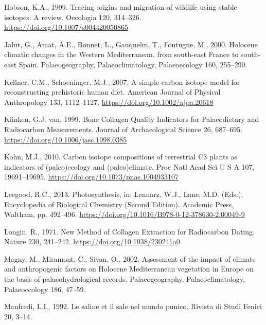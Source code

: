 \documentclass[preprint, 3p, authoryear]{elsarticle} %
\newlength{\cslhangindent}
\newlength{\cslentryspacingunit} %
\newenvironment{CSLReferences}[2] %
 {%
  \setlength{\parindent}{0pt}
  \ifodd #1
  \let\oldpar\par
  \def\par{\hangindent=\cslhangindent\oldpar}
  \fi
  \setlength{\parskip}{#2\cslentryspacingunit}
 }%
 {}
\begin{document}
\begin{CSLReferences}{1}{0}
\leavevmode{}%
Hobson, K.A., 1999. Tracing origins and migration of wildlife using stable isotopes: A review. Oecologia 120, 314--326. \url{https://doi.org/10.1007/s004420050865}

\leavevmode{}%
Jalut, G., Amat, A.E., Bonnet, L., Gauquelin, T., Fontugne, M., 2000. Holocene climatic changes in the {Western Mediterranean}, from south-east {France} to south-east {Spain}. Palaeogeography, Palaeoclimatology, Palaeoecology 160, 255--290.

\leavevmode{}%
Kellner, C.M., Schoeninger, M.J., 2007. A simple carbon isotope model for reconstructing prehistoric human diet. American Journal of Physical Anthropology 133, 1112--1127. \url{https://doi.org/10.1002/ajpa.20618}

\leavevmode{}%
Klinken, G.J. van, 1999. Bone {Collagen Quality Indicators} for {Palaeodietary} and {Radiocarbon Measurements}. Journal of Archaeological Science 26, 687--695. \url{https://doi.org/10.1006/jasc.1998.0385}

\leavevmode{}%
Kohn, M.J., 2010. Carbon isotope compositions of terrestrial {C3} plants as indicators of (paleo)ecology and (paleo)climate. Proc Natl Acad Sci U S A 107, 19691--19695. \url{https://doi.org/10.1073/pnas.1004933107}

\leavevmode{}%
Leegood, R.C., 2013. Photosynthesis, in: Lennarz, W.J., Lane, M.D. (Eds.), Encyclopedia of {Biological Chemistry} ({Second Edition}). {Academic Press}, {Waltham}, pp. 492--496. \url{https://doi.org/10.1016/B978-0-12-378630-2.00049-9}

\leavevmode{}%
Longin, R., 1971. New {Method} of {Collagen Extraction} for {Radiocarbon Dating}. Nature 230, 241--242. \url{https://doi.org/10.1038/230241a0}

\leavevmode{}%
Magny, M., Miramont, C., Sivan, O., 2002. Assessment of the impact of climate and anthropogenic factors on {Holocene Mediterranean} vegetation in {Europe} on the basis of palaeohydrological records. Palaeogeography, Palaeoclimatology, Palaeoecology 186, 47--59.

\leavevmode{}%
Manfredi, L.I., 1992. Le saline et il sale nel mundo punico. Rivista di Studi Fenici 20, 3--14.


\end{CSLReferences}
\end{document}
